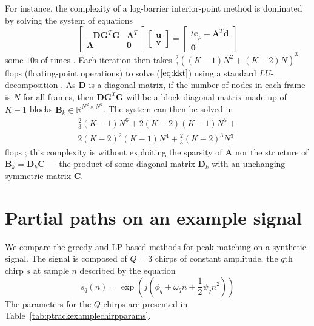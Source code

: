 \documentclass{article}
\newcommand{\cLP}{\boldsymbol{c}_{\rho}}
\newcommand{\BS}[1]{\boldsymbol{#1}}
\begin{document}
\begin{sloppy}
For instance, the complexity of a log-barrier interior-point method is dominated
by solving the system of equations
\begin{equation}
    \label{eq:kkt}
    \begin{bmatrix}
        -\BS{D}\BS{G}^{T}\BS{G} & \BS{A}^{T} \\
        \BS{A} & \BS{0}
    \end{bmatrix}
    \begin{bmatrix}
        \BS{u} \\
        \BS{v}
    \end{bmatrix}
    =
    \begin{bmatrix}
        t\cLP + \BS{A}^{T}\BS{d} \\
        \BS{0}
    \end{bmatrix}
\end{equation}
some $10$s of times \cite[p.~590]{boyd2004convex}. 
Each iteration then takes ${\frac{2}{3}((K-1)N^{2} + (K-2)N)^{3}}$ flops (floating-point
operations) to solve ($\ref{eq:kkt}$) using a standard $LU$-decomposition
\cite[p.~98]{golub1996matrix}. As
$\BS{D}$ is a diagonal matrix, if
the number of nodes in each frame is $N$ for all frames, then
$\BS{D}\BS{G}^{T}\BS{G}$ will be a block-diagonal matrix made up of $K-1$ blocks
$\BS{B}_k \in \mathbb{R}^{N^{2}\times N^{2}}$. The system can then be solved in
\begin{multline*}
    \frac{2}{3}(K-1)N^{6} + 2(K-2)(K-1)N^{5} + \\
    2(K-2)^{2}(K-1)N^{4} + \frac{2}{3}(K-2)^{3}N^{3}
\end{multline*}
flops \cite[p.~675]{boyd2004convex}; this complexity is without exploiting the
sparsity of $\BS{A}$ nor the structure of $\BS{B}_k = \BS{D}_{k}\BS{C}$ --- the product
of some diagonal matrix $\BS{D}_{k}$ with an unchanging symmetric matrix
$\BS{C}$.

\section{Partial paths on an example signal\label{sec:mq_lp_compare_chirp}}

We compare the greedy and LP based methods for peak matching on a synthetic
signal. The signal is composed of $Q=3$ chirps of constant amplitude, the $q$th
chirp $s$ at sample $n$ described by the equation
\[
    s_{q}(n) = \exp(j(\phi_{q} + \omega_{q}n +
    \frac{1}{2} \psi_{q} n^{2}))
\]
The parameters for the $Q$ chirps are presented in
Table~\ref{tab:ptrackexamplechirpparams}.


\end{sloppy}
\end{document}
